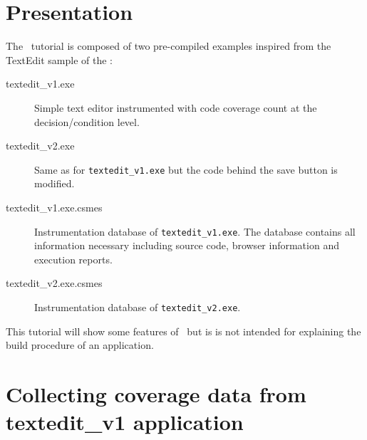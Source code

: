 \section{Presentation}

The \CoverageBrowser\ tutorial is composed of two pre-compiled examples inspired from the TextEdit sample of the \QtLibrary:
\begin{description}
\item[textedit\_v1.exe] Simple text editor instrumented with code coverage count at the decision/condition level. 
\item[textedit\_v2.exe] Same as for \verb$textedit_v1.exe$ but the code behind the save button is modified.
\item[textedit\_v1.exe.csmes] Instrumentation database of \verb$textedit_v1.exe$. The database contains all information necessary including source code, browser information and execution reports.
\item[textedit\_v2.exe.csmes] Instrumentation database of \verb$textedit_v2.exe$.
\end{description}


This tutorial will show some features of \CoverageBrowser\ but is is not intended for explaining the build procedure of an application.

\section{Collecting coverage data from textedit\_v1 application}
